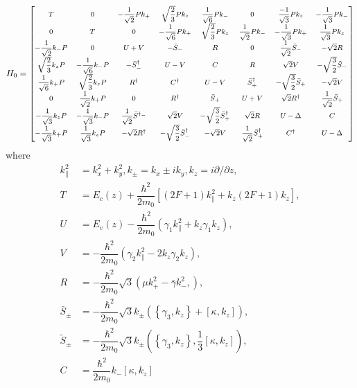 \begin{equation}\label{eqn:chapter-2:section-numerical-calculations-8x8-hamiltonian}
  H_{0}={\footnotesize\begin{bmatrix}
T & 0  &-\dfrac{1}{\sqrt{2}}Pk_{+}& \sqrt{\dfrac{2}{3}} Pk_{z}   & \dfrac{1}{\sqrt{6}}Pk_{-} & 0 & \dfrac{-1}{\sqrt{3}}Pk_{z} & -\dfrac{1}{\sqrt{3}}Pk_{-}\\

0 & T & 0& -\dfrac{1}{\sqrt{6}}Pk_{+}& \sqrt{\dfrac{2}{3}} Pk_{z}& \dfrac{1}{\sqrt{2}}Pk_{-}  &-\dfrac{1}{\sqrt{3}}Pk_{+}& \dfrac{1}{\sqrt{3}}Pk_{z}\\

-\dfrac{1}{\sqrt{2}}k_{-}P & 0 & U+V & -\bar{S}_{-} & R & 0 & \dfrac{1}{\sqrt{2}}\bar{S}_{-} & -\sqrt{2}R\\

\sqrt{\dfrac{2}{3}} k_{z}P&-\dfrac{1}{\sqrt{6}}k_{-}P& -\bar{S}^{\dagger}_{-}&U-V&C&R&\sqrt{2}V&-\sqrt{\dfrac{3}{2}}\tilde{S}_{-}\\
\dfrac{1}{\sqrt{6}}k_{+}P & \sqrt{\dfrac{2}{3}}k_{z}P&R^{\dagger}&C^{\dagger}&U-V&\bar{S}^{\dagger}_{+}&-\sqrt{\dfrac{3}{2}}\bar{S}_{+}&-\sqrt{2}V\\
0&\dfrac{1}{\sqrt{2}}k_{+}P&0&R^{\dagger}&\bar{S}_{+}&U+V&\sqrt{2}R^{\dagger}&\dfrac{1}{\sqrt{2}}\bar{S}_{+}\\
-\dfrac{1}{\sqrt{3}}k_{z}P&-\dfrac{1}{\sqrt{3}}k_{-}P&\dfrac{1}{\sqrt{2}}\bar{S}^{\dagger_{-}}&\sqrt{2}V&-\sqrt{\dfrac{3}{2}}\bar{S}^{\dagger}_{+}&\sqrt{2}R&U-\Delta&C\\
-\dfrac{1}{\sqrt{3}}k_{+}P&\dfrac{1}{\sqrt{3}}k_{z}P&-\sqrt{2}R^{\dagger}&-\sqrt{\dfrac{3}{2}}\bar{S}^{\dagger}_{-}&-\sqrt{2}V&\dfrac{1}{\sqrt{2}}\bar{S}^{\dagger}_{+}&C^{\dagger}&U-\Delta\\
\end{bmatrix}}
\end{equation}
where 
\begin{align*}
	k^{2}_{\parallel}&=k_{x}^{2}+k^{2}_{y},  k_{\pm}=k_{x}\pm ik_{y},  k_{z}=i\partial/\partial z,\\
	T&=E_{c}(z)+\dfrac{\hbar^{2}}{2m_{0}}\left[(2F+1)k^{2}_{\parallel}+k_{z}(2F+1)k_{z}\right], \\
	U&=E_{v}(z)-\dfrac{\hbar^{2}}{2m_{0}}\left(\gamma_{1}k^{2}_{\parallel}+k_{z}\gamma_{1}k_{z} \right),\\ 
	V&=-\dfrac{\hbar^{2}}{2m_{0}}\left(\gamma_{2}k^{2}_{\parallel}-2k_{z}\gamma_{2}k_{z}\right),\\ 
	R&=-\dfrac{\hbar^{2}}{2m_{0}}\sqrt{3}\left(\mu k^{2}_{+}-\bar{\gamma}k^{2}_{-},\right),\\
	\bar{S}_{\pm}&=-\dfrac{\hbar^{2}}{2m_{0}}\sqrt{3}k_{\pm}\left(\left\lbrace\gamma_{3},k_{z}\right\rbrace+\left[\kappa,k_{z}\right]\right),\\
	\tilde{S}_{\pm}&=-\dfrac{\hbar^{2}}{2m_{0}}\sqrt{3}k_{\pm}\left(\left\lbrace\gamma_{3},k_{z}\right\rbrace,\dfrac{1}{3}\left[\kappa,k_{z}\right]\right),\\
	C&=\dfrac{\hbar^{2}}{2m_{0}}k_{-}\left[\kappa,k_{z}\right]
\end{align*}
